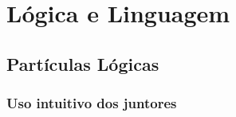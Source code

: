 
\chapter{Lógica e Linguagem}

\section{Partículas Lógicas}

\subsection{Uso intuitivo dos juntores}
